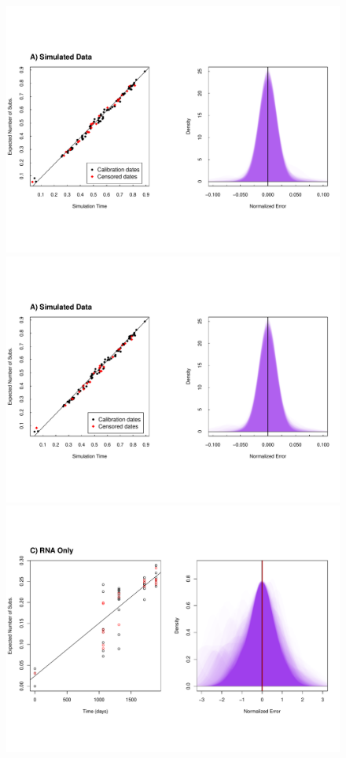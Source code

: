 \begin{figure}[!ht] \label{fig:results1}
	\centering
	\includegraphics[trim=0cm 0cm 0cm 6cm, clip=true, scale=0.425]{figures/simulated.pdf} \\
	\includegraphics[trim=0cm 0cm 0cm 7cm, clip=true,scale=0.425]{figures/simulated_latent.pdf}\\
	\includegraphics[trim=0cm 0cm 0cm 7cm, clip=true,scale=0.425]{figures/ancre.pdf}\\

\end{figure}
